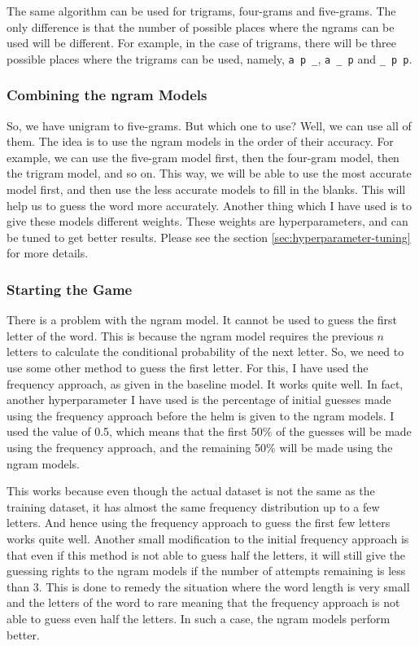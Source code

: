 \documentclass[12pt]{article}
\begin{document}
The same algorithm can be used for trigrams, four-grams and five-grams. The only difference is that the number of possible places where the ngrams can be used will be different. For example, in the case of trigrams, there will be three possible places where the trigrams can be used, namely, \verb|a p _|, \verb|a _ p| and \verb|_ p p|.

\subsubsection{Combining the ngram Models}
So, we have unigram to five-grams. But which one to use? Well, we can use all of them. The idea is to use the ngram models in the order of their accuracy. For example, we can use the five-gram model first, then the four-gram model, then the trigram model, and so on. This way, we will be able to use the most accurate model first, and then use the less accurate models to fill in the blanks. This will help us to guess the word more accurately. Another thing which I have used is to give these models different weights. These weights are hyperparameters, and can be tuned to get better results. Please see the section \ref{sec:hyperparameter-tuning} for more details.

\subsubsection{Starting the Game}
There is a problem with the ngram model. It cannot be used to guess the first letter of the word. This is because the ngram model requires the previous $n$ letters to calculate the conditional probability of the next letter. So, we need to use some other method to guess the first letter. For this, I have used the frequency approach, as given in the baseline model. It works quite well. In fact, another hyperparameter I have used is the percentage of initial guesses made using the frequency approach before the helm is given to the ngram models. I used the value of 0.5, which means that the first 50\% of the guesses will be made using the frequency approach, and the remaining 50\% will be made using the ngram models.

This works because even though the actual dataset is not the same as the training dataset, it has almost the same frequency distribution up to a few letters. And hence using the frequency approach to guess the first few letters works quite well. Another small modification to the initial frequency approach is that even if this method is not able to guess half the letters, it will still give the guessing rights to the ngram models if the number of attempts remaining is less than 3. This is done to remedy the situation where the word length is very small and the letters of the word to rare meaning that the frequency approach is not able to guess even half the letters. In such a case, the ngram models perform better.
\end{document}
